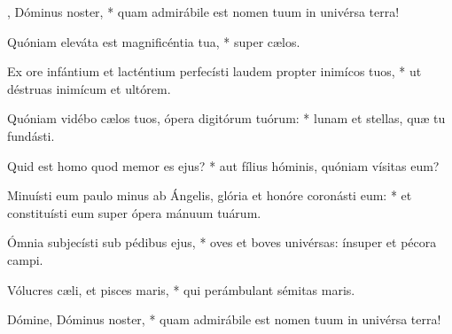 \begin{psalmus}
		\nopagebreak

    , Dóminus noster, * quam admirábile est nomen tuum in univérsa terra!

    Quóniam eleváta est magnificéntia tua, * super cælos.

    Ex ore infántium et lacténtium perfecísti laudem propter inimícos tuos, * ut déstruas inimícum et ultórem.

    Quóniam vidébo cælos tuos, ópera digitórum tuórum: * lunam et stellas, quæ tu fundásti.

    Quid est homo quod memor es ejus? * aut fílius hóminis, quóniam vísitas eum?

    Minuísti eum paulo minus ab Ángelis, glória et honóre coronásti eum: * et constituísti eum super ópera mánuum tuárum.

    Ómnia subjecísti sub pédibus ejus, * oves et boves univérsas: ínsuper et pécora campi.

    Vólucres cæli, et pisces maris, * qui perámbulant sémitas maris.

    Dómine, Dóminus noster, * quam admirábile est nomen tuum in univérsa terra!

\end{psalmus}
